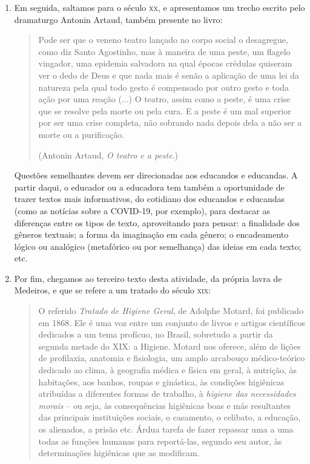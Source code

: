 \documentclass[12pt]{extarticle}
\begin{document}
\begin{enumerate}
Pode"-se também aproveitar este momento para introduzir os educandos e
educandas, gradativamente, na ideia de que nem sempre se leem as doenças
da mesma forma, e que isso acarreta outra rotina de cuidados com os
corpos, reforçando, dessa maneira, a ligação das questões linguísticas
com diversas outras áreas do conhecimento, como a medicina, a biologia e
a antropologia, por exemplo.

\item Em seguida, saltamos para o século \textsc{xx}, e apresentamos um trecho escrito
pelo dramaturgo Antonin Artaud, também presente no livro:

\begin{quote}
Pode ser que o veneno teatro lançado no corpo social o desagregue, como
diz Santo Agostinho, mas à maneira de uma peste, um flagelo vingador,
uma epidemia salvadora na qual épocas crédulas quiseram ver o dedo de
Deus e que nada mais é senão a aplicação de uma lei da natureza pela
qual todo gesto é compensado por outro gesto e toda ação por uma reação
(...) O teatro, assim como a peste, é uma crise que se resolve pela
morte ou pela cura. E a peste é um mal superior por ser uma crise
completa, não sobrando nada depois dela a não ser a morte ou a
purificação.

(Antonin Artaud, \emph{O teatro e a peste}.)
\end{quote}

Questões semelhantes devem ser direcionadas aos educandos e educandas. A
partir daqui, o educador ou a educadora tem também a oportunidade de
trazer textos mais informativos, do cotidiano dos educandos e educandas
(como as notícias sobre a COVID-19, por exemplo), para destacar as
diferenças entre os tipos de texto, aproveitando para pensar: a
finalidade dos gêneros textuais; a forma da imaginação em cada gênero; o
encadeamento lógico ou analógico (metafórico ou por semelhança) das
ideias em cada texto; etc. 

\item Por fim, chegamos ao terceiro texto desta
atividade, da própria lavra de Medeiros, e que se refere a um tratado do
século \textsc{xix}:

\begin{quote}
O referido \emph{Tratado de Higiene Geral}, de Adolphe Motard, foi
publicado em 1868. Ele é uma voz entre um conjunto de livros e artigos
científicos dedicados a um tema profícuo, no Brasil, sobretudo a partir
da segunda metade do XIX: a Higiene. Motard nos oferece, além de lições
de profilaxia, anatomia e fisiologia, um amplo arcabouço médico-teórico
dedicado ao clima, à geografia médica e física em geral, à nutrição, às
habitações, aos banhos, roupas e ginástica, às condições higiênicas
atribuídas a diferentes formas de trabalho, à \emph{higiene das
necessidades morais} -- ou seja, às consequências higiênicas boas e más
resultantes das principais instituições sociais, o casamento, o
celibato, a educação, os alienados, a prisão etc. Árdua tarefa de fazer
repassar uma a uma todas as funções humanas para reportá-las, segundo
seu autor, às determinações higiênicas que as modificam.


\end{quote}
\end{enumerate}
\end{document}
